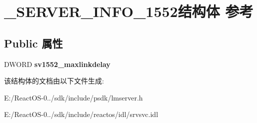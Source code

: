 \hypertarget{struct___s_e_r_v_e_r___i_n_f_o__1552}{}\section{\+\_\+\+S\+E\+R\+V\+E\+R\+\_\+\+I\+N\+F\+O\+\_\+1552结构体 参考}
\label{struct___s_e_r_v_e_r___i_n_f_o__1552}
\subsection*{Public 属性}
\begin{DoxyCompactItemize}
\item 
\mbox{\label{struct___s_e_r_v_e_r___i_n_f_o__1552_ae420f4d23dbb1f6dfcc2b5e5b397efc3}} 
D\+W\+O\+RD {\bfseries sv1552\+\_\+maxlinkdelay}
\end{DoxyCompactItemize}


该结构体的文档由以下文件生成\+:\begin{DoxyCompactItemize}
\item 
E\+:/\+React\+O\+S-\/0../sdk/include/psdk/lmserver.\+h\item 
E\+:/\+React\+O\+S-\/0../sdk/include/reactos/idl/srvsvc.\+idl\end{DoxyCompactItemize}
